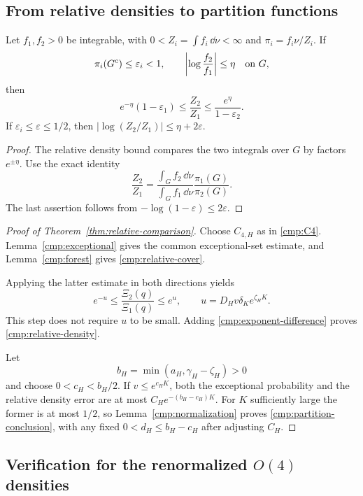 \subsection{From relative densities to partition functions}

\begin{lemma}
\label{cmp:normalization}
Let \(f_1,f_2>0\) be integrable, with \(0<Z_i=\int f_i\,\dd\nu<\infty\)
and \(\pi_i=f_i\nu/Z_i\).  If
\[
 \pi_i(G^c)\le\varepsilon_i<1,\qquad
 \left|\log\frac{f_2}{f_1}\right|\le\eta\quad\hbox{on }G,
\]
then
\begin{equation}
 e^{-\eta}(1-\varepsilon_1)
       \le\frac{Z_2}{Z_1}
       \le\frac{e^\eta}{1-\varepsilon_2}.
 \label{cmp:normalization-bound}
\end{equation}
If \(\varepsilon_i\le\varepsilon\le1/2\), then
\(\left|\log(Z_2/Z_1)\right|\le\eta+2\varepsilon\).
\end{lemma}

\begin{proof}
The relative density bound compares the two integrals over \(G\)
by factors \(e^{\pm\eta}\).  Use the exact identity
\[
 \frac{Z_2}{Z_1}
   =\frac{\int_G f_2\,\dd\nu}{\int_G f_1\,\dd\nu}
                       \frac{\pi_1(G)}{\pi_2(G)}.
\]
The last assertion follows from
\(-\log(1-\varepsilon)\le2\varepsilon\).
\end{proof}

\begin{proof}[Proof of Theorem~\ref{thm:relative-comparison}]
Choose \(C_{4,H}\) as in \eqref{cmp:C4}.  Lemma~\ref{cmp:exceptional}
gives the common exceptional-set estimate, and
Lemma~\ref{cmp:forest} gives \eqref{cmp:relative-cover}.

Applying the latter estimate in both directions yields
\[
 e^{-u}\le\frac{\Xi_2(q)}{\Xi_1(q)}\le e^u,\qquad
 u=D_Hv\delta_K e^{\zeta_HK}.
\]
This step does not require \(u\) to be small.
Adding \eqref{cmp:exponent-difference} proves
\eqref{cmp:relative-density}.

Let
\[
 b_H=\min(a_H,\gamma_H-\zeta_H)>0
\]
and choose \(0<c_H<b_H/2\).  If \(v\le e^{c_HK}\), both the exceptional
probability and the relative density error are at most
\(C_He^{-(b_H-c_H)K}\).  For \(K\) sufficiently large the former is
at most \(1/2\), so Lemma~\ref{cmp:normalization} proves
\eqref{cmp:partition-conclusion}, with any fixed
\(0<d_H\le b_H-c_H\) after adjusting \(C_H\).
\end{proof}

\subsection{Verification for the renormalized \(O(4)\) densities}

